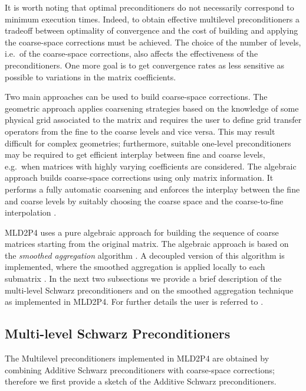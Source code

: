 It is worth noting that optimal preconditioners do not necessarily correspond
to minimum execution times. Indeed, to obtain effective multilevel preconditioners
a tradeoff between optimality of convergence and the cost of building and applying
the coarse-space corrections must be achieved. The choice of the number of levels,
i.e.\ of the coarse-space corrections, also affects the effectiveness of the
preconditioners. One more goal is to get convergence rates as less sensitive
as possible to variations in the matrix coefficients.

Two main approaches can be used to build coarse-space corrections. The geometric approach
applies coarsening strategies based on the knowledge of some physical grid associated
to the matrix and requires the user to define grid transfer operators from the fine
to the coarse levels and vice versa. This may result difficult for complex geometries;
furthermore, suitable one-level preconditioners may be required to get efficient
interplay between fine and coarse levels, e.g.\ when matrices with highly varying coefficients
are considered. The algebraic approach builds coarse-space corrections using only matrix
information. It performs a fully automatic coarsening and enforces the interplay between
the fine and coarse levels by suitably choosing the coarse space and the coarse-to-fine
interpolation \cite{StubenGMD69_99}.

MLD2P4 uses a pure algebraic approach for building the sequence of coarse matrices
starting from the original matrix. The algebraic approach is based on the \emph{smoothed 
aggregation} algorithm \cite{Brezina_Vanek_,Vanek_Mandel_Brezina_}. A decoupled version
of this algorithm is implemented, where the smoothed aggregation is applied locally
to each submatrix \cite{Tuminaro_Tong_00}. In the next two subsections we provide
a brief description of the multi-level Schwarz preconditioners and on the smoothed
aggregation technique as implemented in MLD2P4. For further details the user
is referred to \cite{para_04,apnum_07,aaecc_07,dd2_96}.


\subsection{Multi-level Schwarz Preconditioners\label{sec:multilevel}}

The Multilevel preconditioners implemented in MLD2P4 are obtained by combining
Additive Schwarz preconditioners with coarse-space corrections; therefore
we first provide a sketch of the Additive Schwarz preconditioners.

